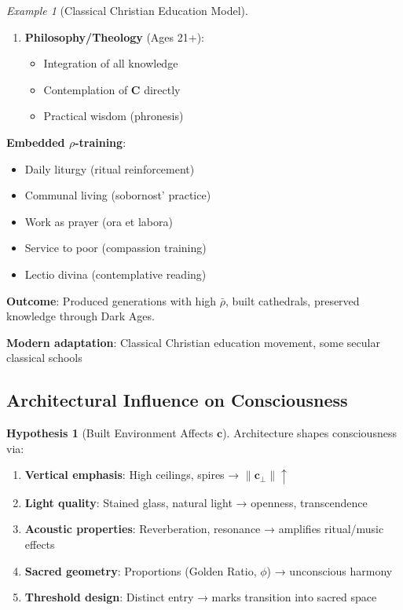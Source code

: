 \documentclass[11pt,a4paper]{article}
\theoremstyle{definition}
\newtheorem{hypothesis}{Hypothesis}[section]
\theoremstyle{remark}
\newtheorem{example}{Example}[section]
\newcommand{\cc}{\mathbf{c}}
\begin{document}
\begin{enumerate}
\begin{protocol}
\begin{example}[Classical Christian Education Model]
\begin{enumerate}
    \item \textbf{Philosophy/Theology} (Ages 21+):
        \begin{itemize}
            \item Integration of all knowledge
            \item Contemplation of \(\mathbf{C}\) directly
            \item Practical wisdom (phronesis)
        \end{itemize}
\end{enumerate}

\textbf{Embedded \(\rho\)-training}:
\begin{itemize}
    \item Daily liturgy (ritual reinforcement)
    \item Communal living (sobornost' practice)
    \item Work as prayer (ora et labora)
    \item Service to poor (compassion training)
    \item Lectio divina (contemplative reading)
\end{itemize}

\textbf{Outcome}: Produced generations with high \(\bar{\rho}\), built cathedrals, preserved knowledge through Dark Ages.

\textbf{Modern adaptation}: Classical Christian education movement, some secular classical schools
\end{example}

\subsection{Architectural Influence on Consciousness}

\begin{hypothesis}[Built Environment Affects \(\cc\)]
Architecture shapes consciousness via:
\begin{enumerate}
    \item \textbf{Vertical emphasis}: High ceilings, spires → \(\|\cc_\perp\| \uparrow\)
    \item \textbf{Light quality}: Stained glass, natural light → openness, transcendence
    \item \textbf{Acoustic properties}: Reverberation, resonance → amplifies ritual/music effects
    \item \textbf{Sacred geometry}: Proportions (Golden Ratio, \(\phi\)) → unconscious harmony
    \item \textbf{Threshold design}: Distinct entry → marks transition into sacred space
\end{enumerate}


\end{hypothesis}
\end{protocol}
\end{enumerate}
\end{document}
